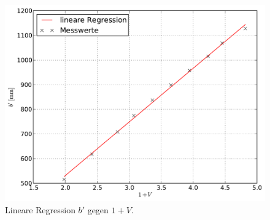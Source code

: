 		\begin{figure}[h!]
			\centering
			\includegraphics[width = 15cm]{img/graph_abbe_b.pdf}
			\caption{Lineare Regression $b'$ gegen $1 + V$.}
			\label{fig:lin_reg_g}
		\end{figure}